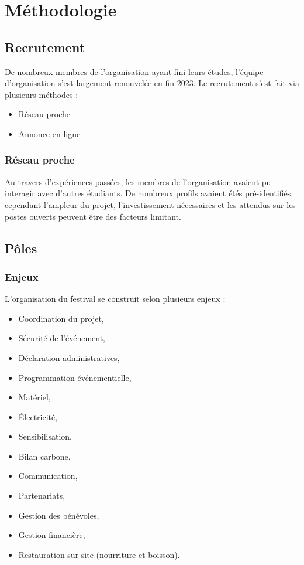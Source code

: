 \documentclass[12pt,a4paper]{report}
\begin{document}
\section{Méthodologie}
\subsection{Recrutement}
De nombreux membres de l'organisation ayant fini leurs études, l'équipe d'organisation s'est largement renouvelée en fin 2023.
Le recrutement s'est fait via plusieurs méthodes : 
\begin{itemize}
\item Réseau proche
\item Annonce en ligne
\end{itemize}

\subsubsection{Réseau proche}
Au travers d'expériences passées, les membres de l'organisation avaient pu interagir avec d'autres étudiants. De nombreux profils avaient étés pré-identifiés, cependant l'ampleur du projet, l'investissement nécessaires et les attendus sur les postes ouverts peuvent être des facteurs limitant.

\subsection{Pôles}
\subsubsection{Enjeux}
L'organisation du festival se construit selon plusieurs enjeux : 
\begin{itemize}
\item Coordination du projet,
\item Sécurité de l'événement,
\item Déclaration administratives,
\item Programmation événementielle,
\item Matériel,
\item Électricité,
\item Sensibilisation,
\item Bilan carbone,
\item Communication,
\item Partenariats,
\item Gestion des bénévoles,
\item Gestion financière,
\item Restauration sur site (nourriture et boisson). \\
\end{itemize}
\end{document}
